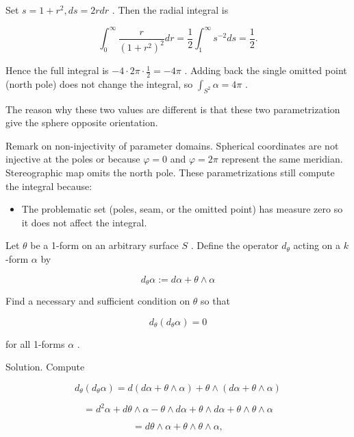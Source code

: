 \documentclass[10pt]{article}
\begin{document}
Set \(s = 1 + {r}^{2},{ds} = {2rdr}\) . Then the radial integral is

\[
{\int }_{0}^{\infty }\frac{r}{{\left( 1 + {r}^{2}\right) }^{2}}{dr} = \frac{1}{2}{\int }_{1}^{\infty }{s}^{-2}{ds} = \frac{1}{2}.
\]

Hence the full integral is \(- 4 \cdot  {2\pi } \cdot  \frac{1}{2} =  - {4\pi }\) . Adding back the single omitted point (north pole) does not change the integral, so \({\int }_{{S}^{2}}\alpha  = {4\pi }\) .

The reason why these two values are different is that these two parametrization give the sphere opposite orientation.

Remark on non-injectivity of parameter domains. Spherical coordinates are not injective at the poles or because \(\varphi  = 0\) and \(\varphi  = {2\pi }\) represent the same meridian. Stereographic map omits the north pole. These parametrizations still compute the integral because:

\begin{itemize}\relax
\item\relax The problematic set (poles, seam, or the omitted point) has measure zero so it does not affect the integral.
\end{itemize}

\begin{problem}[title=PROBLEM 2 (3 POINTS)]
Let \(\theta\) be a 1-form on an arbitrary surface \(S\) . Define the operator \({d}_{\theta }\) acting on a \(k\) -form \(\alpha\) by

\[
{d}_{\theta }\alpha  \mathrel{\text{ := }} {d\alpha } + \theta  \land  \alpha
\]

Find a necessary and sufficient condition on \(\theta\) so that

\[
{d}_{\theta }\left( {{d}_{\theta }\alpha }\right)  = 0
\]

for all 1-forms \(\alpha\) .
\end{problem}

Solution. Compute

\[
{d}_{\theta }\left( {{d}_{\theta }\alpha }\right)  = d\left( {{d\alpha } + \theta  \land  \alpha }\right)  + \theta  \land  \left( {{d\alpha } + \theta  \land  \alpha }\right)
\]

\[
= {d}^{2}\alpha  + {d\theta } \land  \alpha  - \theta  \land  {d\alpha } + \theta  \land  {d\alpha } + \theta  \land  \theta  \land  \alpha
\]

\[
= {d\theta } \land  \alpha  + \theta  \land  \theta  \land  \alpha ,
\]
\end{document}
